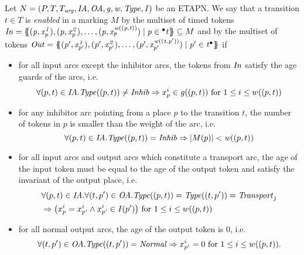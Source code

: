 \begin{definition}[Enabledness]
\label{def:enabledness}
 Let $N = (P, T, T_{\mathit{urg}}, \mathit{IA},\allowbreak \mathit{OA}, \mathit{g}, \mathit{w}, \mathit{Type}, \mathit{I})$ be an ETAPN. 
We say that a transition $t \in T$ is \emph{enabled} in a marking $M$ by the 
multiset of timed tokens \newline 
$\mathit{In} = \mathit{\{\!\!\{(p,x_{p}^1), (p,x_{p}^2), \dots ,(p,x_{p}^{\mathit{w} ((p,t))})\mid 
p \in {}^\bullet t\}\!\!\}} \subseteq M$ and by the multiset of tokens
$\mathit{Out} = \mathit{\{\!\!\{ (p^{\prime},x_{p^{\prime}}^1),
           (p^{\prime},x_{p^{\prime}}^2),
\dots ,\allowbreak
(p^{\prime},x_{p^{\prime}}^{\mathit{w} ((t,p^{\prime}))}) 
\mid p^{\prime} \in t^\bullet \}\!\!\}}$ if
\begin{itemize}
\item for all input arcs except the inhibitor arcs, the tokens from $\mathit{In}$ satisfy the age guards of the arcs, i.e. 
$$\forall(p,t) \in \mathit{IA}. \mathit{Type}((p,t)) \neq \mathit{Inhib} \Rightarrow  x_p^i \in \mathit{g}((p,t))\text{ for }1\leq i\leq w((p,t)) $$ 
\item for any inhibitor arc pointing from a place $p$ to the
transition $t$, the number of tokens in $p$ is smaller than the weight of the arc, i.e.
$$\forall(p,t) \in \mathit{IA}. \mathit{Type}((p,t)) = \mathit{Inhib} \Rightarrow|M(p)|<\mathit{w} ((p,t))$$ 
\item for all input arcs and output arcs which constitute a transport arc, 
the age of the input token must be equal to the age of the output token and satisfy the invariant of the output place, i.e.
\begin{eqnarray*}
&\forall(p,t) \in \mathit{IA}. \forall(t,p^{\prime}) \in \mathit{OA}.\mathit{Type}((p,t)) = \mathit{Type}((t,p^{\prime})) 
= \mathit{Transport}_j \\
&\Rightarrow \big( x_p^i = x_{p^{\prime}}^i \wedge x_{p^{\prime}}^i \in 
\mathit{I}(p^{\prime})\big) \text{ for } 1\leq i \leq w((p,t))
\end{eqnarray*}
\item for all normal output arcs, the age of the output token is $0$, i.e. $$\forall(t,p^{\prime}) \in \mathit{OA}. \mathit{Type}((t,p^{\prime})) = \mathit{Normal} \Rightarrow x_{p^{\prime}}^i = 0 \text{ for }1\leq i \leq w((p,t)).$$ 
\end{itemize}
\end{definition}


